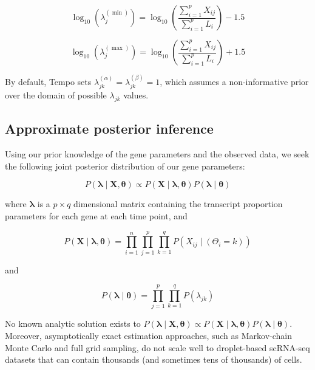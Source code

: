 \documentclass[12pt]{article}
\begin{document}
\begin{equation}
\log_{10}\!\left( \lambda_{j}^{(\min)} \right) = \log_{10}\!\left( \frac{\sum_{i=1}^{p} X_{ij}}{\sum_{i=1}^{p} L_{i}} \right) - 1.5
\end{equation}

\begin{equation}
\log_{10}\!\left( \lambda_{j}^{(\max)} \right) = \log_{10}\!\left( \frac{\sum_{i=1}^{p} X_{ij}}{\sum_{i=1}^{p} L_{i}} \right) + 1.5
\end{equation}

By default, Tempo sets $\lambda_{jk}^{(\alpha)} = \lambda_{jk}^{(\beta)} = 1$, which
assumes a non-informative prior over the domain of possible $\lambda_{jk}$ values.

\subsection*{Approximate posterior inference}

Using our prior knowledge of the gene parameters and the observed data, we seek the following joint
posterior distribution of our gene parameters:

\begin{equation}
P\!\left( \boldsymbol{\lambda} \mid \mathbf{X}, \boldsymbol{\theta} \right) \propto P\!\left( \mathbf{X} \mid \boldsymbol{\lambda}, \boldsymbol{\theta} \right) P\!\left( \boldsymbol{\lambda} \mid \boldsymbol{\theta} \right)
\end{equation}

where $\boldsymbol{\lambda}$ is a $p \times q$ dimensional matrix containing the transcript
proportion parameters for each gene at each time point, and

\begin{equation}
P\!\left( \mathbf{X} \mid \boldsymbol{\lambda}, \boldsymbol{\theta} \right) = \prod_{i=1}^{n} \prod_{j=1}^{p} \prod_{k=1}^{q} P(X_{ij} \mid (\Theta_{i} = k))
\end{equation}

and

\begin{equation}
P\!\left( \boldsymbol{\lambda} \mid \boldsymbol{\theta} \right) = \prod_{j=1}^{p} \prod_{k=1}^{q} P\!\left( \lambda_{jk} \right)
\end{equation}

No known analytic solution exists to $P\!\left( \boldsymbol{\lambda} \mid \mathbf{X},
\boldsymbol{\theta} \right) \propto P\!\left( \mathbf{X} \mid \boldsymbol{\lambda}, \boldsymbol{\theta}
\right) P\!\left( \boldsymbol{\lambda} \mid \boldsymbol{\theta} \right)$. Moreover, asymptotically
exact estimation approaches, such as Markov-chain Monte Carlo and full grid sampling, do not scale
well to droplet-based scRNA-seq datasets that can contain thousands (and sometimes tens of
thousands) of cells.
\end{document}
